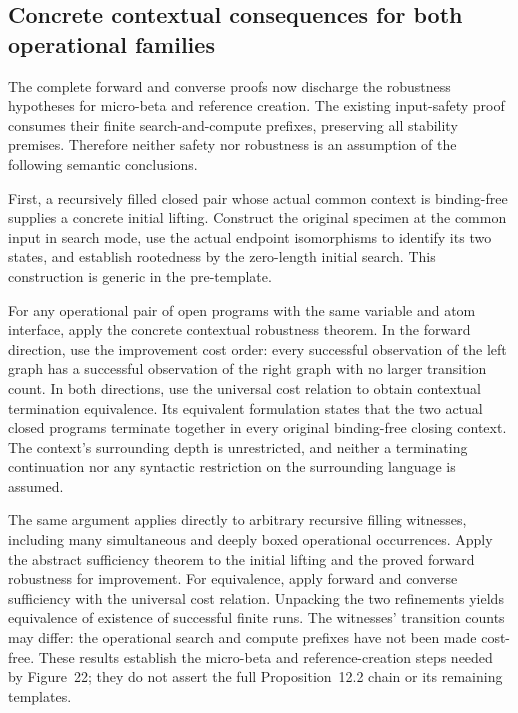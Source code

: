 \subsection{Concrete contextual consequences for both operational families}
The complete forward and converse proofs now discharge the robustness
hypotheses for micro-beta and reference creation. The existing input-safety
proof consumes their finite search-and-compute prefixes, preserving all
stability premises. Therefore neither safety nor robustness is an assumption
of the following semantic conclusions.

First, a recursively filled closed pair whose actual common context is
binding-free supplies a concrete initial lifting. Construct the original
specimen at the common input in search mode, use the actual endpoint
isomorphisms to identify its two states, and establish rootedness by the
zero-length initial search. This construction is generic in the pre-template.

For any operational pair of open programs with the same variable and atom
interface, apply the concrete contextual robustness theorem. In the forward
direction, use the improvement cost order: every successful observation of
the left graph has a successful observation of the right graph with no
larger transition count. In both directions, use the universal cost relation
to obtain contextual termination equivalence. Its equivalent formulation
states that the two actual closed programs terminate together in every
original binding-free closing context. The context's surrounding depth is
unrestricted, and neither a terminating continuation nor any syntactic
restriction on the surrounding language is assumed.

The same argument applies directly to arbitrary recursive filling witnesses,
including many simultaneous and deeply boxed operational occurrences.
Apply the abstract sufficiency theorem to the initial lifting and the proved
forward robustness for improvement. For equivalence, apply forward and
converse sufficiency with the universal cost relation. Unpacking the two
refinements yields equivalence of existence of successful finite runs.
The witnesses' transition counts may differ: the operational search and
compute prefixes have not been made cost-free. These results establish the
micro-beta and reference-creation steps needed by Figure~22; they do not
assert the full Proposition~12.2 chain or its remaining templates.

